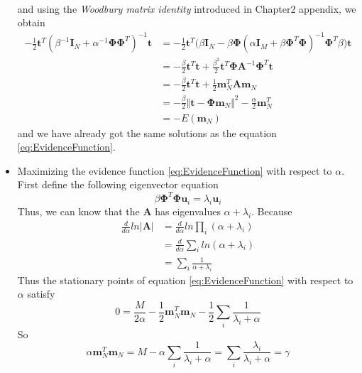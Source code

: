 \documentclass[12pt, a4paper]{article}
\begin{document}
\begin{itemize}
\begin{align*}
        \end{align*}
        and using the \textit{Woodbury matrix identity} introduced in Chapter2 appendix, we obtain
        \begin{align*}
            -\frac{1}{2}\bm{t}^T(\beta^{-1}\bm{I}_N+\alpha^{-1}\bm{\Phi}\bm{\Phi}^T)^{-1}\bm{t}&=
            -\frac{1}{2}\bm{t}^T\Big(\beta\bm{I}_N-\beta\bm{\Phi}(\alpha\bm{I}_M+\beta\bm{\Phi}^T
            \bm{\Phi})^{-1}\bm{\Phi}^T\beta\Big)\bm{t}\\
            &=-\frac{\beta}{2}\bm{t}^T\bm{t}+\frac{\beta^2}{2}\bm{t}^T\bm{\Phi}\bm{A}^{-1}\bm{\Phi}^T\bm{t}\\
            &=-\frac{\beta}{2}\bm{t}^T\bm{t}+\frac{1}{2}\bm{m}_N^T\bm{A}\bm{m}_N\\
            &=-\frac{\beta}{2}\Vert\bm{t}-\bm{\Phi}\bm{m}_N\Vert^2-\frac{\alpha}{2}\bm{m}_N^T\\
            &=-E(\bm{m}_N)
        \end{align*}
        and we have already got the same solutions as the equation \ref{eq:EvidenceFunction}.
        \item Maximizing the evidence function \ref{eq:EvidenceFunction} with respect to $\alpha$. First define
        the following eigenvector equation
        \begin{equation}
            \beta\bm{\Phi}^T\bm{\Phi}\bm{u}_i=\lambda_i\bm{u}_i
        \end{equation}
        Thus, we can know that the $\bm{A}$ has eigenvalues $\alpha+\lambda_i$. Because
        \begin{align*}
            \frac{d}{d\alpha}ln\vert\bm{A}\vert&=\frac{d}{d\alpha}ln\prod_i(\alpha+\lambda_i)\\
            &=\frac{d}{d\alpha}\sum_iln(\alpha+\lambda_i)\\
            &=\sum_i\frac{1}{\alpha+\lambda_i}
        \end{align*}
        Thus the stationary points of equation \ref{eq:EvidenceFunction} with respect to $\alpha$ satisfy
        \begin{equation}
            0=\frac{M}{2\alpha}-\frac{1}{2}\bm{m}_N^T\bm{m}_N-\frac{1}{2}\sum_i\frac{1}{\lambda_i+\alpha}
        \end{equation}
        So
        \begin{equation}
            \alpha\bm{m}_N^T\bm{m}_N=M-\alpha\sum_i\frac{1}{\lambda_i+\alpha}=\sum_i\frac{\lambda_i}
            {\lambda_i+\alpha}=\gamma
        \end{equation}

\end{itemize}
\end{document}
